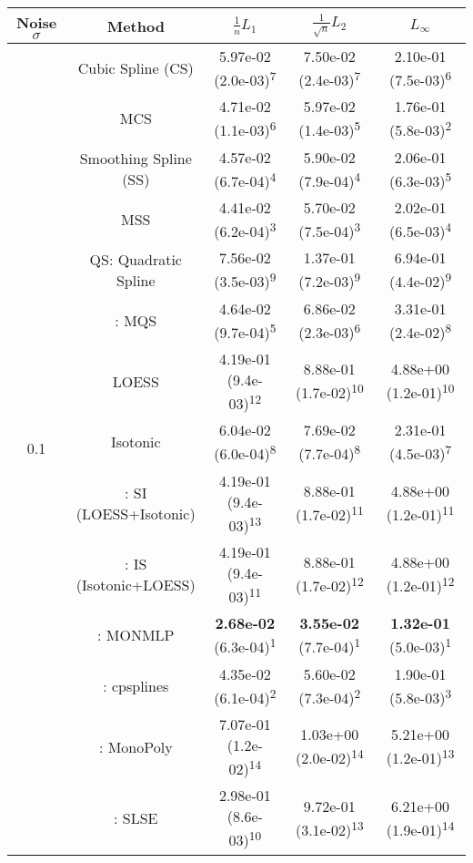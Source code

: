 \begin{tabular}{ccccc}
\toprule
Noise $\sigma$ & Method&$\frac 1n L_1$&$\frac{1}{\sqrt n}L_2$&$L_\infty$\tabularnewline
\midrule
\multirow{14}{*}{0.1}&Cubic Spline (CS)& 5.97e-02 (2.0e-03)\textsuperscript{7}& 7.50e-02 (2.4e-03)\textsuperscript{7}& 2.10e-01 (7.5e-03)\textsuperscript{6}\tabularnewline
&MCS& 4.71e-02 (1.1e-03)\textsuperscript{6}& 5.97e-02 (1.4e-03)\textsuperscript{5}& 1.76e-01 (5.8e-03)\textsuperscript{2}\tabularnewline
&Smoothing Spline (SS)& 4.57e-02 (6.7e-04)\textsuperscript{4}& 5.90e-02 (7.9e-04)\textsuperscript{4}& 2.06e-01 (6.3e-03)\textsuperscript{5}\tabularnewline
&MSS& 4.41e-02 (6.2e-04)\textsuperscript{3}& 5.70e-02 (7.5e-04)\textsuperscript{3}& 2.02e-01 (6.5e-03)\textsuperscript{4}\tabularnewline
&QS: Quadratic Spline& 7.56e-02 (3.5e-03)\textsuperscript{9}& 1.37e-01 (7.2e-03)\textsuperscript{9}& 6.94e-01 (4.4e-02)\textsuperscript{9}\tabularnewline
&\textcite{heMonotoneBsplineSmoothing1998}: MQS& 4.64e-02 (9.7e-04)\textsuperscript{5}& 6.86e-02 (2.3e-03)\textsuperscript{6}& 3.31e-01 (2.4e-02)\textsuperscript{8}\tabularnewline
&LOESS& 4.19e-01 (9.4e-03)\textsuperscript{12}& 8.88e-01 (1.7e-02)\textsuperscript{10}& 4.88e+00 (1.2e-01)\textsuperscript{10}\tabularnewline
&Isotonic& 6.04e-02 (6.0e-04)\textsuperscript{8}& 7.69e-02 (7.7e-04)\textsuperscript{8}& 2.31e-01 (4.5e-03)\textsuperscript{7}\tabularnewline
&\textcite{mammenEstimatingSmoothMonotone1991}: SI (LOESS+Isotonic)& 4.19e-01 (9.4e-03)\textsuperscript{13}& 8.88e-01 (1.7e-02)\textsuperscript{11}& 4.88e+00 (1.2e-01)\textsuperscript{11}\tabularnewline
&\textcite{mammenEstimatingSmoothMonotone1991}: IS (Isotonic+LOESS)& 4.19e-01 (9.4e-03)\textsuperscript{11}& 8.88e-01 (1.7e-02)\textsuperscript{12}& 4.88e+00 (1.2e-01)\textsuperscript{12}\tabularnewline
&\textcite{cannonMonmlpMultilayerPerceptron2017}: MONMLP& \textbf{2.68e-02} (6.3e-04)\textsuperscript{1}& \textbf{3.55e-02} (7.7e-04)\textsuperscript{1}& \textbf{1.32e-01} (5.0e-03)\textsuperscript{1}\tabularnewline
&\textcite{navarro-garciaConstrainedSmoothingOutofrange2023}: cpsplines& 4.35e-02 (6.1e-04)\textsuperscript{2}& 5.60e-02 (7.3e-04)\textsuperscript{2}& 1.90e-01 (5.8e-03)\textsuperscript{3}\tabularnewline
&\textcite{murrayFastFlexibleMethods2016a}: MonoPoly& 7.07e-01 (1.2e-02)\textsuperscript{14}& 1.03e+00 (2.0e-02)\textsuperscript{14}& 5.21e+00 (1.2e-01)\textsuperscript{13}\tabularnewline
&\textcite{groeneboomConfidenceIntervalsMonotone2023}: SLSE& 2.98e-01 (8.6e-03)\textsuperscript{10}& 9.72e-01 (3.1e-02)\textsuperscript{13}& 6.21e+00 (1.9e-01)\textsuperscript{14}\tabularnewline
\midrule

\end{tabular}

